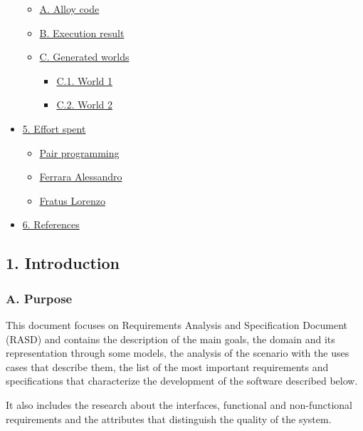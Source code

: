 \documentclass[
]{article}
\providecommand{\tightlist}{%
  \setlength{\itemsep}{0pt}\setlength{\parskip}{0pt}}
\begin{document}
\begin{itemize}
  \begin{itemize}
  \tightlist
  \item
    \protect\hyperlink{a-alloy-code}{A. Alloy code}
  \item
    \protect\hyperlink{b-execution-result}{B. Execution result}
  \item
    \protect\hyperlink{c-generated-worlds}{C. Generated worlds}

    \begin{itemize}
    \tightlist
    \item
      \protect\hyperlink{c1-world-1}{C.1. World 1}
    \item
      \protect\hyperlink{c2-world-2}{C.2. World 2}
    \end{itemize}
  \end{itemize}
\item
  \protect\hyperlink{5-effort-spent}{5. Effort spent}

  \begin{itemize}
  \tightlist
  \item
    \protect\hyperlink{pair-programming}{Pair programming}
  \item
    \protect\hyperlink{ferrara-alessandro}{Ferrara Alessandro}
  \item
    \protect\hyperlink{fratus-lorenzo}{Fratus Lorenzo}
  \end{itemize}
\item
  \protect\hyperlink{6-references}{6. References}
\end{itemize}

\hypertarget{introduction}{%
\subsection{1. Introduction}\label{introduction}}

\hypertarget{a.-purpose}{%
\subsubsection{A. Purpose}\label{a.-purpose}}

This document focuses on Requirements Analysis and Specification
Document (RASD) and contains the description of the main goals, the
domain and its representation through some models, the analysis of the
scenario with the uses cases that describe them, the list of the most
important requirements and specifications that characterize the
development of the software described below.

It also includes the research about the interfaces, functional and
non-functional requirements and the attributes that distinguish the
quality of the system.
\end{document}
